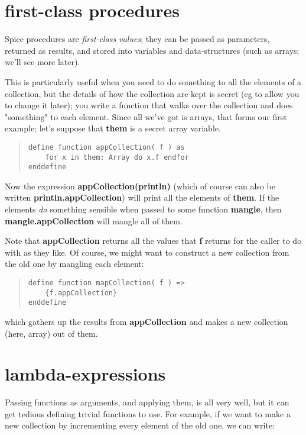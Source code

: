 \documentclass{report}
\begin{document}
\section{first-class procedures}


Spice procedures are {\em first-class values}; they can be passed as parameters,
returned as results, and stored into variables and data-structures (such as
arrays; we'll see more later).

This is particularly useful when you need to do something to all the elements
of a collection, but the details of how the collection are kept is secret
(eg to allow you to change it later); you write a function that walks over
the collection and does "something" to each element. Since all we've got
is arrays, that forms our first example; let's suppose that {\bf them} is
a secret array variable.

\begin{quote}
\begin{verbatim}
define function appCollection( f ) as
    for x in them: Array do x.f endfor
enddefine
\end{verbatim}
\end{quote}


Now the expression {\bf appCollection(println)} (which of course can also be
written {\bf println.appCollection}) will print all the elements of {\bf them}. If the
elements {\em do} something sensible when passed to some function {\bf mangle}, then
{\bf mangle.appCollection} will mangle all of them.

Note that {\bf appCollection} returns all the values that {\bf f} returns for the
caller to do with as they like. Of course, we might want to construct a new
collection from the old one by mangling each element:

\begin{quote}
\begin{verbatim}
define function mapCollection( f ) =>
    {f.appCollection}
enddefine
\end{verbatim}
\end{quote}


which gathers up the results from {\bf appCollection} and makes a new collection
(here, array) out of them.

\section{lambda-expressions}


Passing functions as arguments, and applying them, is all very well, but it
can get tedious defining trivial functions to use. For example, if
we want to make a new collection by incrementing every element of the
old one, we can write:
\end{document}
